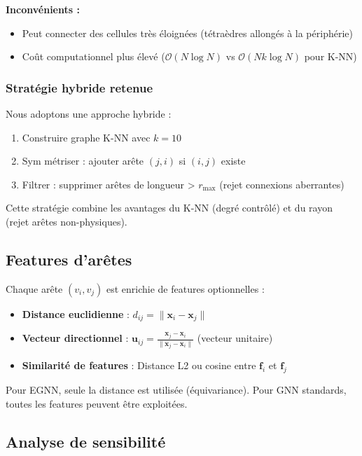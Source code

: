 \textbf{Inconvénients :}
\begin{itemize}
    \item Peut connecter des cellules très éloignées (tétraèdres allongés à la périphérie)
    \item Coût computationnel plus élevé ($\mathcal{O}(N \log N)$ vs $\mathcal{O}(N k \log N)$ pour K-NN)
\end{itemize}

\subsubsection{Stratégie hybride retenue}

Nous adoptons une approche hybride :
\begin{enumerate}
    \item Construire graphe K-NN avec $k = 10$
    \item Sym métriser : ajouter arête $(j,i)$ si $(i,j)$ existe
    \item Filtrer : supprimer arêtes de longueur > $r_{\max}$ (rejet connexions aberrantes)
\end{enumerate}

Cette stratégie combine les avantages du K-NN (degré contrôlé) et du rayon (rejet arêtes non-physiques).

\subsection{Features d'arêtes}

Chaque arête $(v_i, v_j)$ est enrichie de features optionnelles :

\begin{itemize}
    \item \textbf{Distance euclidienne} : $d_{ij} = \|\mathbf{x}_i - \mathbf{x}_j\|$
    \item \textbf{Vecteur directionnel} : $\mathbf{u}_{ij} = \frac{\mathbf{x}_j - \mathbf{x}_i}{\|\mathbf{x}_j - \mathbf{x}_i\|}$ (vecteur unitaire)
    \item \textbf{Similarité de features} : Distance L2 ou cosine entre $\mathbf{f}_i$ et $\mathbf{f}_j$
\end{itemize}

Pour EGNN, seule la distance est utilisée (équivariance). Pour GNN standards, toutes les features peuvent être exploitées.

\subsection{Analyse de sensibilité}

